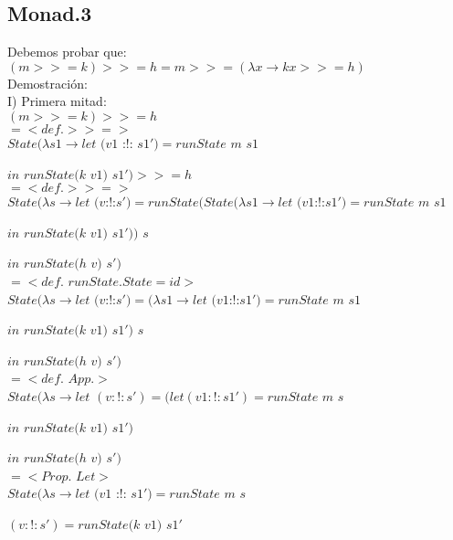 \documentclass[12pt, titlepage]{article}
\begin{document}
\newpage
\subsection*{Monad.3}
Debemos probar que: $(m >>= k) >>= h = m >>= (\lambda x \rightarrow k x >>= h )$\\
Demostración:\\

\noindent I) Primera mitad:\\
$(m >>= k) >>= h$\\
$=<def. >>=>$\\
$State (\lambda s1 \rightarrow  let$ $(v1$ :!: $s1') = runState$ $m$ $s1$
 	    
\hspace{45pt} $in$ $runState (k$ $v1)$ $s1') >>= h$\\
$=<def. >>=>$\\
$State (\lambda s$$\rightarrow$$let$ $(v$:!:$s')$$=
$$runState(State (\lambda s1$$\rightarrow$$let$ $(v1$:!:$s1') = runState$ $m$ $s1$

\hspace{210pt} $in$ $runState (k$ $v1)$ $s1'))$ $s$

\hspace{40pt}$in$ $runState (h$ $v)$ $s')$\\
$=<def.$ $runState.State = id>$\\
$State (\lambda s$$\rightarrow$$let$ $(v$:!:$s')$$=
$$(\lambda s1$$\rightarrow$$let$ $(v1$:!:$s1') = runState$ $m$ $s1$

\hspace{130pt} $in$ $runState (k$ $v1)$ $s1')$ $s$

\hspace{40pt}$in$ $runState (h$ $v)$ $s')$\\
$=<def.$ $App.>$\\
$State (\lambda s \rightarrow let$ $(v :!: s') = (let (v1 :!: s1') = runState$ $m$ $s$

\hspace{215pt}$in$ $runState (k$ $v1)$ $s1')$

\hspace{48pt}$in$ $runState (h$ $v)$ $s')$\\
$=<Prop.$ $Let>$\\
$State (\lambda s \rightarrow let$ $(v1$ :!: $s1') = runState$ $m$ $s$

\hspace{62pt}$(v :!: s') = runState (k$ $v1)$ $s1'$
\end{document}
